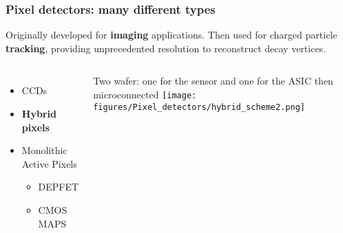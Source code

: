     \begin{frame}[noframenumbering]
        \frametitle{Pixel detectors: many different types}
        Originally developed for \textbf{imaging} applications. Then used for charged particle \textbf{tracking}, providing unprecedented resolution to reconstruct decay vertices.\\%
        \begin{columns}
                \begin{itemize}
                    \item CCDs 
                    \item \textbf{Hybrid pixels}
                    \item Monolithic Active Pixels
                    \begin{itemize}
                        \item DEPFET %
                        \item CMOS MAPS
                    \end{itemize}
                \end{itemize}
                \bigskip
                Two wafer: one for the sensor and one for the ASIC  then microconnected
                \centering\texttt{[image: figures/Pixel\_detectors/hybrid\_scheme2.png]} 
        \end{columns}
    \end{frame}

